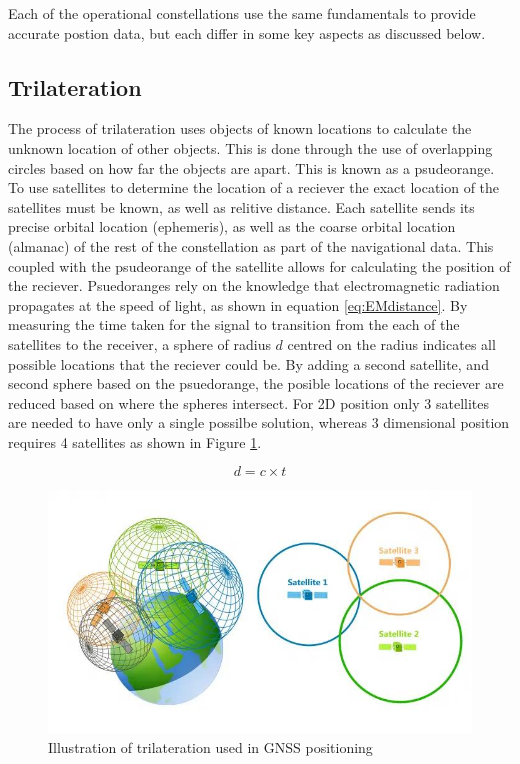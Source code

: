 Each of the operational constellations use the same fundamentals to provide accurate postion data, but each differ in some key aspects as discussed below.

\subsection{Trilateration} \label{subsec:Trilateration}
The process of trilateration uses objects of known locations to calculate the unknown location of other objects. This is done through the use of overlapping circles based
on how far the objects are apart. This is known as a psudeorange. To use satellites to determine the location of a reciever the exact location of the satellites must be
known, as well as relitive distance. Each satellite sends its precise orbital location (ephemeris), as well as the coarse orbital location (almanac) of the rest of the
constellation as part of the navigational data. This coupled with the psudeorange of the satellite allows for calculating the position of the reciever. Psuedoranges rely
on the knowledge that electromagnetic radiation propagates at the speed of light, as shown in equation \ref{eq:EMdistance}. By measuring the time taken for the signal to
transition from the each of the satellites to the receiver, a sphere of radius $d$ centred on the radius indicates all possible locations that the reciever could be. By
adding a second satellite, and second sphere based on the psuedorange, the posible locations of the reciever are reduced based on where the spheres intersect. For 2D
position only 3 satellites are needed to have only a single possilbe solution, whereas 3 dimensional position requires 4 satellites as shown in Figure
\ref{fig:trilateration}.


\begin{equation} \label{eq:EMdistance}
    d = c \times t
\end{equation}

\begin{figure}[h]
    \begin{centering}
        \includegraphics[width=14cm,keepaspectratio]{Figures/trilateration.png}
        \caption{Illustration of trilateration used in GNSS positioning}
        \label{fig:trilateration}
    \end{centering}
\end{figure}

